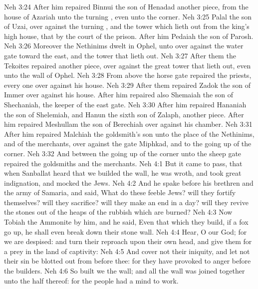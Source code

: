 \vs Neh 3:24 After him repaired Binnui the son of Henadad another piece, from the house of Azariah unto the turning , even unto the corner.
\vs Neh 3:25 Palal the son of Uzai, over against the turning , and the tower which lieth out from the king's high house, that  by the court of the prison. After him Pedaiah the son of Parosh.
\vs Neh 3:26 Moreover the Nethinims dwelt in Ophel, unto  over against the water gate toward the east, and the tower that lieth out.
\vs Neh 3:27 After them the Tekoites repaired another piece, over against the great tower that lieth out, even unto the wall of Ophel.
\vs Neh 3:28 From above the horse gate repaired the priests, every one over against his house.
\vs Neh 3:29 After them repaired Zadok the son of Immer over against his house. After him repaired also Shemaiah the son of Shechaniah, the keeper of the east gate.
\vs Neh 3:30 After him repaired Hananiah the son of Shelemiah, and Hanun the sixth son of Zalaph, another piece. After him repaired Meshullam the son of Berechiah over against his chamber.
\vs Neh 3:31 After him repaired Malchiah the goldsmith's son unto the place of the Nethinims, and of the merchants, over against the gate Miphkad, and to the going up of the corner.
\vs Neh 3:32 And between the going up of the corner unto the sheep gate repaired the goldsmiths and the merchants.
\vs Neh 4:1 But it came to pass, that when Sanballat heard that we builded the wall, he was wroth, and took great indignation, and mocked the Jews.
\vs Neh 4:2 And he spake before his brethren and the army of Samaria, and said, What do these feeble Jews? will they fortify themselves? will they sacrifice? will they make an end in a day? will they revive the stones out of the heaps of the rubbish which are burned?
\vs Neh 4:3 Now Tobiah the Ammonite  by him, and he said, Even that which they build, if a fox go up, he shall even break down their stone wall.
\vs Neh 4:4 Hear, O our God; for we are despised: and turn their reproach upon their own head, and give them for a prey in the land of captivity:
\vs Neh 4:5 And cover not their iniquity, and let not their sin be blotted out from before thee: for they have provoked  to anger before the builders.
\vs Neh 4:6 So built we the wall; and all the wall was joined together unto the half thereof: for the people had a mind to work.
